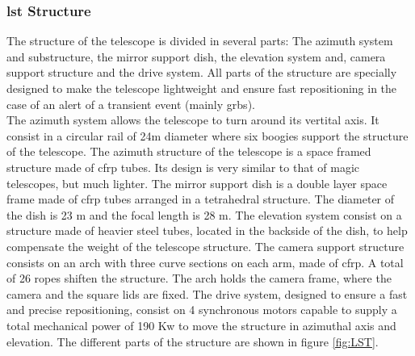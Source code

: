 \documentclass[main.tex]{subfiles}
\begin{document}
\subsubsection{\gls{lst} Structure}

The structure of the telescope is divided in several parts: The azimuth system and substructure, the mirror support dish, the elevation system and, camera support structure and the drive system. All parts of the structure are specially designed to make the telescope lightweight and ensure fast repositioning in the case of an alert of a transient event (mainly \glspl{grb}).\\
The azimuth system allows the telescope to turn around its vertital axis. It consist in a circular rail of 24m diameter where six boogies support the structure of the telescope. The azimuth structure of the telescope is a space framed structure made of \gls{cfrp} tubes. Its design is very similar to that of \gls{magic} telescopes, but much lighter. The mirror support dish is a double layer space frame made of \gls{cfrp} tubes arranged in a tetrahedral structure. The diameter of the dish is 23 m and the focal length is 28 m. The elevation system consist on a structure made of heavier steel tubes, located in the backside of the dish, to help compensate the weight of the telescope structure. The camera support structure consists on an arch with three curve sections on each arm, made of \gls{cfrp}. A total of 26 ropes shiften the structure. The arch holds the camera frame, where the camera and the square lids are fixed. The drive system, designed to ensure a fast and precise repositioning, consist on 4 synchronous motors capable to supply a total mechanical power of 190 Kw to move the structure in azimuthal axis and elevation. The different parts of the structure are shown in figure \ref{fig:LST}.
    
\end{document}
